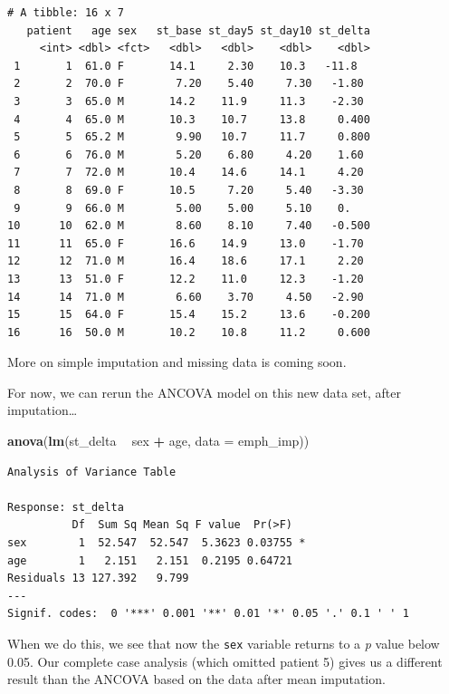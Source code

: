 \documentclass[]{book}
\newenvironment{Shaded}{\begin{snugshade}}{\end{snugshade}}
\newcommand{\KeywordTok}[1]{\textcolor[rgb]{0.13,0.29,0.53}{\textbf{#1}}}
\newcommand{\DataTypeTok}[1]{\textcolor[rgb]{0.13,0.29,0.53}{#1}}
\newcommand{\StringTok}[1]{\textcolor[rgb]{0.31,0.60,0.02}{#1}}
\newcommand{\OperatorTok}[1]{\textcolor[rgb]{0.81,0.36,0.00}{\textbf{#1}}}
\newcommand{\NormalTok}[1]{#1}
\theoremstyle{definition}
\theoremstyle{definition}
\theoremstyle{definition}
\theoremstyle{remark}
\begin{document}
\begin{verbatim}
# A tibble: 16 x 7
   patient   age sex   st_base st_day5 st_day10 st_delta
     <int> <dbl> <fct>   <dbl>   <dbl>    <dbl>    <dbl>
 1       1  61.0 F       14.1     2.30    10.3   -11.8  
 2       2  70.0 F        7.20    5.40     7.30   -1.80 
 3       3  65.0 M       14.2    11.9     11.3    -2.30 
 4       4  65.0 M       10.3    10.7     13.8     0.400
 5       5  65.2 M        9.90   10.7     11.7     0.800
 6       6  76.0 M        5.20    6.80     4.20    1.60 
 7       7  72.0 M       10.4    14.6     14.1     4.20 
 8       8  69.0 F       10.5     7.20     5.40   -3.30 
 9       9  66.0 M        5.00    5.00     5.10    0.   
10      10  62.0 M        8.60    8.10     7.40   -0.500
11      11  65.0 F       16.6    14.9     13.0    -1.70 
12      12  71.0 M       16.4    18.6     17.1     2.20 
13      13  51.0 F       12.2    11.0     12.3    -1.20 
14      14  71.0 M        6.60    3.70     4.50   -2.90 
15      15  64.0 F       15.4    15.2     13.6    -0.200
16      16  50.0 M       10.2    10.8     11.2     0.600
\end{verbatim}

More on simple imputation and missing data is coming soon.

For now, we can rerun the ANCOVA model on this new data set, after
imputation\ldots{}

\begin{Shaded}
\begin{Highlighting}[]
\KeywordTok{anova}\NormalTok{(}\KeywordTok{lm}\NormalTok{(st_delta }\OperatorTok{~}\StringTok{ }\NormalTok{sex }\OperatorTok{+}\StringTok{ }\NormalTok{age, }\DataTypeTok{data =}\NormalTok{ emph_imp))}
\end{Highlighting}
\end{Shaded}

\begin{verbatim}
Analysis of Variance Table

Response: st_delta
          Df  Sum Sq Mean Sq F value  Pr(>F)  
sex        1  52.547  52.547  5.3623 0.03755 *
age        1   2.151   2.151  0.2195 0.64721  
Residuals 13 127.392   9.799                  
---
Signif. codes:  0 '***' 0.001 '**' 0.01 '*' 0.05 '.' 0.1 ' ' 1
\end{verbatim}

When we do this, we see that now the \texttt{sex} variable returns to a
\emph{p} value below 0.05. Our complete case analysis (which omitted
patient 5) gives us a different result than the ANCOVA based on the data
after mean imputation.
\end{document}
